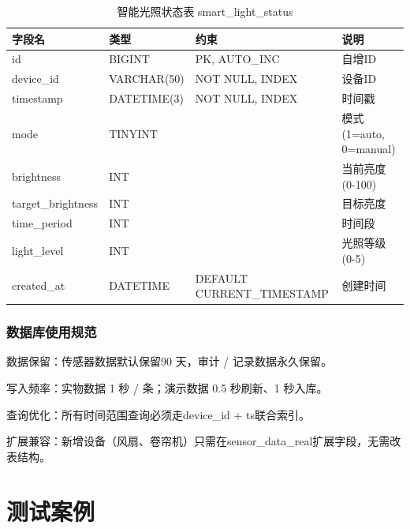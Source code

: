 \documentclass{article}
\begin{document}
\begin{table}[htbp]
  \centering
  \caption{智能光照状态表 smart\_light\_status}
  \label{tab:智能补光状态表}
  \begin{tabular}{|l|l|l|l|}
    \hline
    字段名            & 类型        & 约束                        & 说明                   \\
    \hline
    id                & BIGINT      & PK, AUTO\_INC               & 自增ID                 \\
    device\_id         & VARCHAR(50) & NOT NULL, INDEX             & 设备ID                 \\
    timestamp         & DATETIME(3) & NOT NULL, INDEX             & 时间戳                 \\
    mode              & TINYINT     &                             & 模式(1=auto, 0=manual) \\
    brightness        & INT         &                             & 当前亮度(0-100)        \\
    target\_brightness & INT         &                             & 目标亮度               \\
    time\_period       & INT         &                             & 时间段                 \\
    light\_level       & INT         &                             & 光照等级(0-5)          \\
    created\_at        & DATETIME    & DEFAULT CURRENT\_TIMESTAMP  & 创建时间               \\
    \hline
  \end{tabular}
\end{table}

\subsubsection{数据库使用规范}

数据保留：传感器数据默认保留90 天，审计 / 记录数据永久保留。

写入频率：实物数据 1 秒 / 条；演示数据 0.5 秒刷新、1 秒入库。

查询优化：所有时间范围查询必须走device\_id + ts联合索引。

扩展兼容：新增设备（风扇、卷帘机）只需在sensor\_data\_real扩展字段，无需改表结构。

\section{测试案例}
\end{document}
